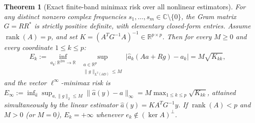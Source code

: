 \documentclass[11pt,reqno]{amsart}
\newtheorem{theorem}{Theorem}[section]
\theoremstyle{definition}
\theoremstyle{remark}
\newcommand{\C}{\mathbb{C}}
\newcommand{\R}{\mathbb{R}}
\begin{document}
\begin{theorem}[Exact finite-band minimax risk over all nonlinear estimators]\label{thm:finite-minimax}
For any distinct nonzero complex frequencies $s_1,\dots,s_m \in \C \setminus \{0\}$, the Gram matrix $G = R R^*$ is strictly positive definite, with elementary closed-form entries. Assume $\operatorname{rank}(A) = p$, and set $K = (A^T G^{-1} A)^{-1} \in \R^{p\times p}$. Then for every $M \ge 0$ and every coordinate $1 \le k \le p$:
\begin{equation}\label{eq:minimax-exact}
  E_k := \inf_{\widehat a_k : \R^{2m}\to\R}\; \sup_{\substack{a \in \R^p \\ \|g\|_{L^2(\partial D)} \le M}} \bigl|\widehat a_k(A a + R g) - a_k\bigr| = M \sqrt{K_{kk}},
\end{equation}
and the vector $\ell^\infty$-minimax risk is $E_\infty := \inf_{\widehat a}\sup_{a,\|g\|_2\le M} \|\widehat a(y) - a\|_\infty = M \max_{1\le k\le p}\sqrt{K_{kk}}$, attained simultaneously by the linear estimator $\widehat a(y) = K A^T G^{-1} y$. If $\operatorname{rank}(A) < p$ and $M > 0$ (or $M = 0$), $E_k = +\infty$ whenever $e_k \notin (\ker A)^\perp$.
\end{theorem}
\end{document}
